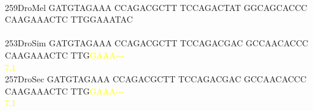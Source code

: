 \documentclass[11pt,twoside,reqno,a4paper]{article}
\begin{document}
{\\
259\hspace*{2\charwidth}DroMel	GATGTAGAAA	CCAGACGCTT	TCCAGACTAT	GGCAGCACCC	CAAGAAACTC	TTGGAAATAC	\\
\hspace*{5\charwidth}\hspace*{7\charwidth}\hspace*{1\charwidth}\hspace*{1\charwidth}\hspace*{1\charwidth}\hspace*{1\charwidth}\hspace*{1\charwidth}\hspace*{1\charwidth}\\
253\hspace*{2\charwidth}DroSim	GATGTAGAAA	CCAGACGCTT	TCCAGACGAC	GCCAACACCC	CAAGAAACTC	TTG\textcolor{Yellow}{G}\textcolor{Yellow}{A}\textcolor{Yellow}{A}\textcolor{Yellow}{A}\textcolor{Yellow}{-}\textcolor{Yellow}{-}\textcolor{Yellow}{-}	\\
\hspace*{5\charwidth}\hspace*{7\charwidth}\hspace*{1\charwidth}\hspace*{1\charwidth}\hspace*{1\charwidth}\hspace*{1\charwidth}\hspace*{1\charwidth}\hspace*{53\charwidth}\textcolor{Yellow}{7.1}\hspace*{1\charwidth}\\
257\hspace*{2\charwidth}DroSec	GATGTAGAAA	CCAGACGCTT	TCCAGACGAC	GCCAACACCC	CAAGAAACTC	TTG\textcolor{Yellow}{G}\textcolor{Yellow}{A}\textcolor{Yellow}{A}\textcolor{Yellow}{A}\textcolor{Yellow}{-}\textcolor{Yellow}{-}\textcolor{Yellow}{-}	\\
\hspace*{5\charwidth}\hspace*{7\charwidth}\hspace*{1\charwidth}\hspace*{1\charwidth}\hspace*{1\charwidth}\hspace*{1\charwidth}\hspace*{1\charwidth}\hspace*{53\charwidth}\textcolor{Yellow}{7.1}\hspace*{1\charwidth}\\
}
\end{document}
